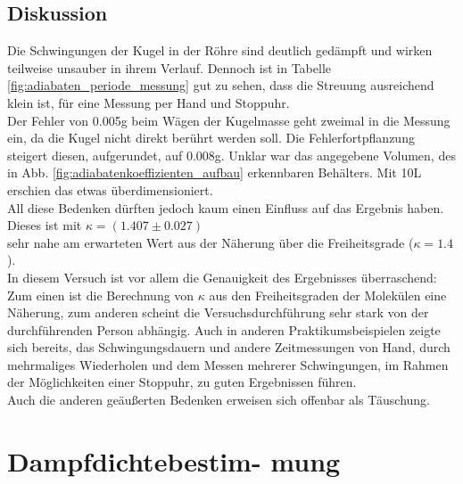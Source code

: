 \documentclass[12pt,a4paper]{article}
\begin{document}
\begin{multicols}{2}
\subsection{Diskussion}
Die Schwingungen der Kugel in der Röhre sind deutlich gedämpft und wirken teilweise unsauber in ihrem Verlauf. Dennoch ist in Tabelle \ref{fig:adiabaten_periode_messung} gut zu sehen, dass die Streuung ausreichend klein ist, für eine Messung per Hand und Stoppuhr.\\
Der Fehler von 0.005g beim Wägen der Kugelmasse geht zweimal in die Messung ein, da die Kugel nicht direkt berührt werden soll. Die Fehlerfortpflanzung steigert diesen, aufgerundet, auf 0.008g. Unklar war das angegebene Volumen, des in Abb. \ref{fig:adiabatenkoeffizienten_aufbau} erkennbaren Behälters. Mit 10L erschien das etwas überdimensioniert.\\
All diese Bedenken dürften jedoch kaum einen Einfluss auf das Ergebnis haben.
Dieses ist mit $\kappa = (1.407 \pm 0.027)$ \\
sehr nahe am erwarteten Wert aus der Näherung über die Freiheitsgrade ($\kappa = 1.4$).\\
In diesem Versuch ist vor allem die Genauigkeit des Ergebnisses überraschend:\\
Zum einen ist die Berechnung von $\kappa$ aus den Freiheitsgraden der Molekülen eine Näherung, zum anderen scheint die Versuchsdurchführung sehr stark von der durchführenden Person abhängig.
Auch in anderen Praktikumsbeispielen zeigte sich bereits, das Schwingungsdauern und andere Zeitmessungen von Hand, durch mehrmaliges Wiederholen und dem Messen mehrerer Schwingungen, im Rahmen der Möglichkeiten einer Stoppuhr, zu guten Ergebnissen führen.\\
Auch die anderen geäußerten Bedenken erweisen sich offenbar als Täuschung.
\pagebreak





\section{Dampfdichtebestim- mung}


\end{multicols}
\end{document}
